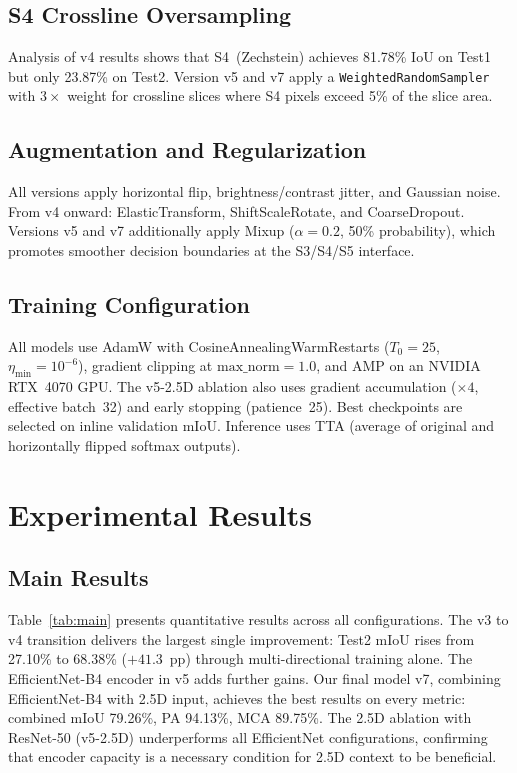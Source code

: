 \documentclass[journal]{IEEEtran}
\begin{document}
\subsection{S4 Crossline Oversampling}

Analysis of v4 results shows that S4~(Zechstein) achieves 81.78\% IoU on Test1 but only 23.87\% on Test2. Version v5 and v7 apply a \texttt{WeightedRandomSampler} with $3\times$ weight for crossline slices where S4 pixels exceed 5\% of the slice area.

\subsection{Augmentation and Regularization}

All versions apply horizontal flip, brightness/contrast jitter, and Gaussian noise. From v4 onward: ElasticTransform, ShiftScaleRotate, and CoarseDropout. Versions v5 and v7 additionally apply Mixup ($\alpha=0.2$, 50\% probability), which promotes smoother decision boundaries at the S3/S4/S5 interface.

\subsection{Training Configuration}

All models use AdamW with CosineAnnealingWarmRestarts ($T_0=25$, $\eta_{\min}=10^{-6}$), gradient clipping at $\text{max\_norm}=1.0$, and AMP on an NVIDIA RTX~4070 GPU. The v5-2.5D ablation also uses gradient accumulation ($\times4$, effective batch~32) and early stopping (patience~25). Best checkpoints are selected on inline validation mIoU. Inference uses TTA (average of original and horizontally flipped softmax outputs).

\section{Experimental Results}
\label{sec:results}

\subsection{Main Results}

Table~\ref{tab:main} presents quantitative results across all configurations. The v3 to v4 transition delivers the largest single improvement: Test2 mIoU rises from 27.10\% to 68.38\% ($+41.3$~pp) through multi-directional training alone. The EfficientNet-B4 encoder in v5 adds further gains. Our final model v7, combining EfficientNet-B4 with 2.5D input, achieves the best results on every metric: combined mIoU 79.26\%, PA 94.13\%, MCA 89.75\%. The 2.5D ablation with ResNet-50 (v5-2.5D) underperforms all EfficientNet configurations, confirming that encoder capacity is a necessary condition for 2.5D context to be beneficial.
\end{document}
